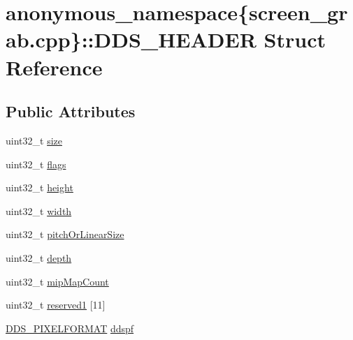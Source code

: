 \hypertarget{structanonymous__namespace_02screen__grab_8cpp_03_1_1_d_d_s___h_e_a_d_e_r}{}\section{anonymous\+\_\+namespace\{screen\+\_\+grab.\+cpp\}\+:\+:D\+D\+S\+\_\+\+H\+E\+A\+D\+ER Struct Reference}
\label{structanonymous__namespace_02screen__grab_8cpp_03_1_1_d_d_s___h_e_a_d_e_r}
\subsection*{Public Attributes}
\begin{DoxyCompactItemize}
\item 
uint32\+\_\+t \mbox{\hyperlink{structanonymous__namespace_02screen__grab_8cpp_03_1_1_d_d_s___h_e_a_d_e_r_a6eec72f0836dfc845cc37a3db0fd98c8}{size}}
\item 
uint32\+\_\+t \mbox{\hyperlink{structanonymous__namespace_02screen__grab_8cpp_03_1_1_d_d_s___h_e_a_d_e_r_a7c8a98c3b7449fcc0dd2cc4ef9b7f8c3}{flags}}
\item 
uint32\+\_\+t \mbox{\hyperlink{structanonymous__namespace_02screen__grab_8cpp_03_1_1_d_d_s___h_e_a_d_e_r_a97496677b3e95ebb3383aaa25cb750c1}{height}}
\item 
uint32\+\_\+t \mbox{\hyperlink{structanonymous__namespace_02screen__grab_8cpp_03_1_1_d_d_s___h_e_a_d_e_r_ad1746f7bb43c3bc3cd507996b894d51d}{width}}
\item 
uint32\+\_\+t \mbox{\hyperlink{structanonymous__namespace_02screen__grab_8cpp_03_1_1_d_d_s___h_e_a_d_e_r_a483bbadc704e12c14b27075d7e54f1dd}{pitch\+Or\+Linear\+Size}}
\item 
uint32\+\_\+t \mbox{\hyperlink{structanonymous__namespace_02screen__grab_8cpp_03_1_1_d_d_s___h_e_a_d_e_r_a737669d512027a7e89dabd634bc73738}{depth}}
\item 
uint32\+\_\+t \mbox{\hyperlink{structanonymous__namespace_02screen__grab_8cpp_03_1_1_d_d_s___h_e_a_d_e_r_aae506666ce1203fa2bfeb3337f2a66f5}{mip\+Map\+Count}}
\item 
uint32\+\_\+t \mbox{\hyperlink{structanonymous__namespace_02screen__grab_8cpp_03_1_1_d_d_s___h_e_a_d_e_r_a3c4425ef6a56c67d8bcc665dbc6c4d31}{reserved1}} \mbox{[}11\mbox{]}
\item 
\mbox{\hyperlink{structanonymous__namespace_02screen__grab_8cpp_03_1_1_d_d_s___p_i_x_e_l_f_o_r_m_a_t}{D\+D\+S\+\_\+\+P\+I\+X\+E\+L\+F\+O\+R\+M\+AT}} \mbox{\hyperlink{structanonymous__namespace_02screen__grab_8cpp_03_1_1_d_d_s___h_e_a_d_e_r_a93bb70f679135db29d225c0782aed27b}{ddspf}}

\end{DoxyCompactItemize}
